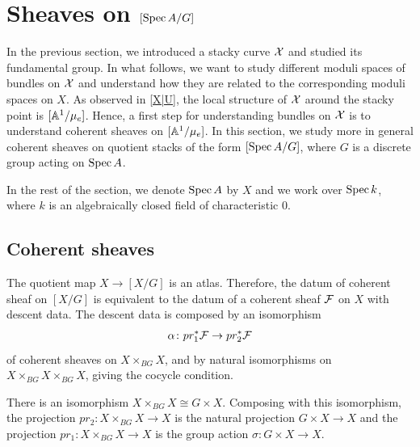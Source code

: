 \section{Sheaves on $[\operatorname{Spec} A / G]$} \label{section: sheaves on [spec A /G]}

In the previous section, we introduced a stacky curve $\mathcal{X}$ and studied its fundamental group. In what follows, we want to study different moduli spaces of bundles on $\mathcal{X}$ and understand how they are related to the corresponding moduli spaces on $X$. As observed in \eqref{X|U}, the local structure of $\mathcal{X}$ around the stacky point is $[\mathbb{A}^1/\mu_e]$. Hence, a first step for understanding bundles on $\mathcal{X}$ is to understand coherent sheaves on $[\mathbb{A}^1 / \mu_e]$. In this section, we study more in general coherent sheaves on quotient stacks of the form $[\operatorname{Spec} A / G]$, where $G$ is a discrete group acting on $\operatorname{Spec} A$.

In the rest of the section, we denote $\operatorname{Spec} A$ by $X$ and we work over $\operatorname{Spec} k$, where $k$ is an algebraically closed field of characteristic $0$.

\subsection{Coherent sheaves}\label{coh([X/G])}

The quotient map $ X \to [ X / G]$ is an atlas. Therefore, the datum of coherent sheaf on $[ X/ G]$ is equivalent to the datum of a coherent sheaf $\mathcal{F}$ on $X $ with descent data. The descent data is composed by an isomorphism
\[
\alpha \colon pr_1^* \mathcal{F} \to pr_2^* \mathcal{F}
\]
of coherent sheaves on $X \times_{BG} X$, and by natural isomorphisms on $X\times_{BG}X\times_{BG} X$, giving the cocycle condition.

\begin{rmk}
There is an isomorphism $X \times_{BG} X \cong G \times X$. Composing with this isomorphism, the projection $pr_2 \colon  X \times_{BG} X \to X$ is the natural projection $ G \times X \to X$ and the projection $pr_1 \colon X \times_{BG} X \to X $ is the group action $\sigma \colon G \times X \to X$.
\end{rmk}

